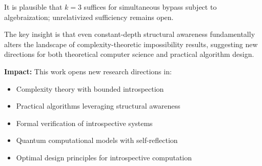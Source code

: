 \documentclass[11pt]{article}
\theoremstyle{definition}
\begin{document}
It is plausible that $k=3$ suffices for simultaneous bypass subject to algebraization; unrelativized sufficiency remains open.

The key insight is that even constant-depth structural awareness fundamentally alters the landscape of complexity-theoretic impossibility results, suggesting new directions for both theoretical computer science and practical algorithm design.

\textbf{Impact:} This work opens new research directions in:
\begin{itemize}
\item Complexity theory with bounded introspection
\item Practical algorithms leveraging structural awareness
\item Formal verification of introspective systems
\item Quantum computational models with self-reflection
\item Optimal design principles for introspective computation
\end{itemize}
\end{document}
